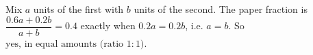 Mix $a$ units of the first with $b$ units of the second. The paper fraction is $\dfrac{0.6a+0.2b}{a+b}=0.4$ exactly when $0.2a=0.2b$, i.e. $a=b$. So $\boxed{\text{yes, in equal amounts (ratio }1:1)}$.
